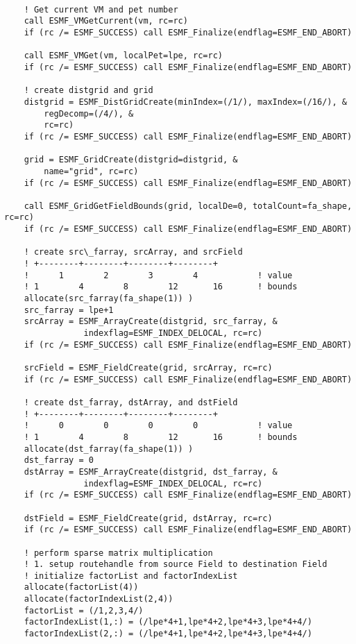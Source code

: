  \begin{verbatim}

    ! Get current VM and pet number
    call ESMF_VMGetCurrent(vm, rc=rc)
    if (rc /= ESMF_SUCCESS) call ESMF_Finalize(endflag=ESMF_END_ABORT)

    call ESMF_VMGet(vm, localPet=lpe, rc=rc)
    if (rc /= ESMF_SUCCESS) call ESMF_Finalize(endflag=ESMF_END_ABORT)

    ! create distgrid and grid
    distgrid = ESMF_DistGridCreate(minIndex=(/1/), maxIndex=(/16/), &
        regDecomp=(/4/), &
        rc=rc)
    if (rc /= ESMF_SUCCESS) call ESMF_Finalize(endflag=ESMF_END_ABORT)

    grid = ESMF_GridCreate(distgrid=distgrid, &
        name="grid", rc=rc)
    if (rc /= ESMF_SUCCESS) call ESMF_Finalize(endflag=ESMF_END_ABORT)

    call ESMF_GridGetFieldBounds(grid, localDe=0, totalCount=fa_shape, rc=rc)
    if (rc /= ESMF_SUCCESS) call ESMF_Finalize(endflag=ESMF_END_ABORT)

    ! create src\_farray, srcArray, and srcField
    ! +--------+--------+--------+--------+
    !      1        2        3        4            ! value
    ! 1        4        8        12       16       ! bounds
    allocate(src_farray(fa_shape(1)) )
    src_farray = lpe+1
    srcArray = ESMF_ArrayCreate(distgrid, src_farray, &
                indexflag=ESMF_INDEX_DELOCAL, rc=rc)
    if (rc /= ESMF_SUCCESS) call ESMF_Finalize(endflag=ESMF_END_ABORT)

    srcField = ESMF_FieldCreate(grid, srcArray, rc=rc)
    if (rc /= ESMF_SUCCESS) call ESMF_Finalize(endflag=ESMF_END_ABORT)

    ! create dst_farray, dstArray, and dstField
    ! +--------+--------+--------+--------+
    !      0        0        0        0            ! value
    ! 1        4        8        12       16       ! bounds
    allocate(dst_farray(fa_shape(1)) )
    dst_farray = 0
    dstArray = ESMF_ArrayCreate(distgrid, dst_farray, &
                indexflag=ESMF_INDEX_DELOCAL, rc=rc)
    if (rc /= ESMF_SUCCESS) call ESMF_Finalize(endflag=ESMF_END_ABORT)

    dstField = ESMF_FieldCreate(grid, dstArray, rc=rc)
    if (rc /= ESMF_SUCCESS) call ESMF_Finalize(endflag=ESMF_END_ABORT)

    ! perform sparse matrix multiplication
    ! 1. setup routehandle from source Field to destination Field
    ! initialize factorList and factorIndexList
    allocate(factorList(4))
    allocate(factorIndexList(2,4))
    factorList = (/1,2,3,4/)
    factorIndexList(1,:) = (/lpe*4+1,lpe*4+2,lpe*4+3,lpe*4+4/)
    factorIndexList(2,:) = (/lpe*4+1,lpe*4+2,lpe*4+3,lpe*4+4/)


\end{verbatim}
